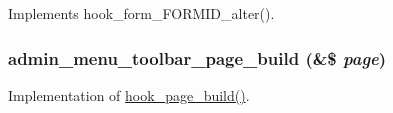 \label{admin__menu__toolbar_8module_aae5cecf58b2e516927281143d392927e}
Implements hook\_\-form\_\-FORMID\_\-alter(). \hypertarget{admin__menu__toolbar_8module_a398c1718f88449b886028877688a4864}{
\subsubsection[{admin\_\-menu\_\-toolbar\_\-page\_\-build}]{\setlength{\rightskip}{0pt plus 5cm}admin\_\-menu\_\-toolbar\_\-page\_\-build (\&\$ {\em page})}}
\label{admin__menu__toolbar_8module_a398c1718f88449b886028877688a4864}
Implementation of \hyperlink{group__hooks_ga16d8d8ae818dc759bbe539e16ff5b93b}{hook\_\-page\_\-build()}. 